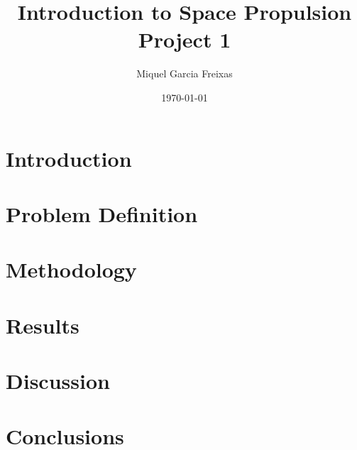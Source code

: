 \documentclass[11pt,a4paper]{article}
\title{
    \textbf{Introduction to Space Propulsion}\\
    \vspace{0.3cm}
    Project 1
}
\author{Miquel Garcia Freixas}
\date{\today}
\begin{document}
\maketitle

\tableofcontents

\newpage

\section{Introduction}

\section{Problem Definition}

\section{Methodology}

\section{Results}

\section{Discussion}

\section{Conclusions}
\end{document}

